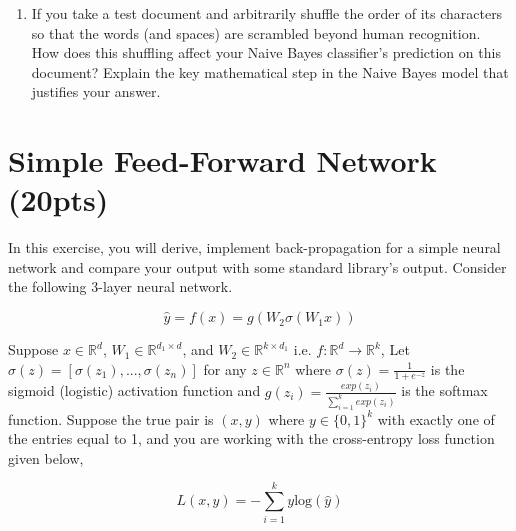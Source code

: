 \documentclass[a4paper]{article}
\theoremstyle{definition}
\begin{document}
\begin{enumerate}
\item If you take a test document and arbitrarily shuffle the order of its characters so that the words (and spaces) are scrambled beyond human recognition.  How does this shuffling affect your Naive Bayes classifier's prediction on this document?  Explain the key mathematical step in the Naive Bayes model that justifies your answer.

\end{enumerate}

\section{Simple Feed-Forward Network (20pts)}
In this exercise, you will derive, implement back-propagation for a simple neural network and compare your output with some standard library’s output. Consider the following 3-layer neural network.

\[
\hat{y} = f(x) = g(W_2\sigma(W_1x))
\]

Suppose $x \in \mathbb{R}^d$, $W_1 \in \mathbb{R}^{d_1 \times d}$, and $W_2 \in \mathbb{R}^{k \times d_1}$ i.e. $f: \mathbb{R}^d \rightarrow \mathbb{R}^k$, Let $\sigma(z) = [\sigma(z_1), ..., \sigma(z_n)]$ for any $z \in \mathbb{R}^n$ where $\sigma(z) = \frac{1}{1 + e^{-z}}$ is the sigmoid (logistic) activation function and $g(z_i) = \frac{exp(z_i)}{\sum_{i=1}^k exp(z_i)}$ is the softmax function. Suppose the true pair is $(x, y)$ where $y \in \{0, 1\}^k$ with exactly one of the entries equal to 1, and you are working with the cross-entropy loss function given below,

\[
L(x, y) = -\sum_{i=1}^k y \text{log}(\hat{y})
\]
\end{document}
